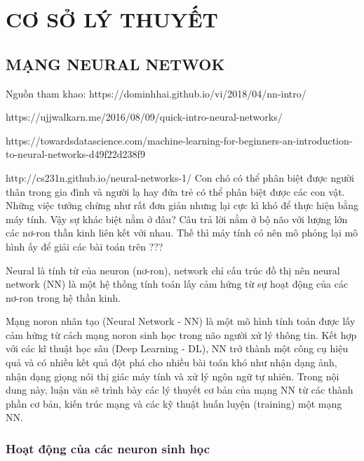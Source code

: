 \chapter{CƠ SỞ LÝ THUYẾT}
\label{c:co_so_ly_thuyet}


\section{MẠNG NEURAL NETWOK}
Nguồn tham khao: https://dominhhai.github.io/vi/2018/04/nn-intro/

				https://ujjwalkarn.me/2016/08/09/quick-intro-neural-networks/
				
				https://towardsdatascience.com/machine-learning-for-beginners-an-introduction-to-neural-networks-d49f22d238f9
				
				http://cs231n.github.io/neural-networks-1/
Con chó có thể phân biệt được người thân trong gia đình và người lạ hay đứa trẻ có thể phân biệt được các con vật. Những việc tưởng chừng như rất đơn giản nhưng lại cực kì khó để thực hiện bằng máy tính. Vậy sự khác biệt nằm ở đâu? Câu trả lời nằm ở bộ não với lượng lớn các nơ-ron thần kinh liên kết với nhau. Thế thì máy tính có nên mô phỏng lại mô hình ấy để giải các bài toán trên ???

Neural là tính từ của neuron (nơ-ron), network chỉ cấu trúc đồ thị nên neural network (NN) là một hệ thống tính toán lấy cảm hứng từ sự hoạt động của các nơ-ron trong hệ thần kinh.

Mạng noron nhân tạo (Neural Network - NN) là một mô hình tính toán được lấy cảm hứng từ cách mạng noron sinh học trong não người xử lý thông tin. Kết hợp với các kĩ thuật học sâu (Deep Learning - DL), NN  trở thành một công cụ hiệu quả và có nhiều kết quả đột phá cho nhiều bài toán khó như nhận dạng ảnh, nhận dạng giọng nói thị giác máy tính và xử lý ngôn ngữ tự nhiên. Trong nội dung này, luận văn sẽ trình bày các lý thuyết cơ bản của mạng NN từ các thành phần cơ bản, kiến trúc mạng và các kỹ thuật huấn luyện (training) một mạng NN.

\subsection{Hoạt động của các neuron sinh học}


